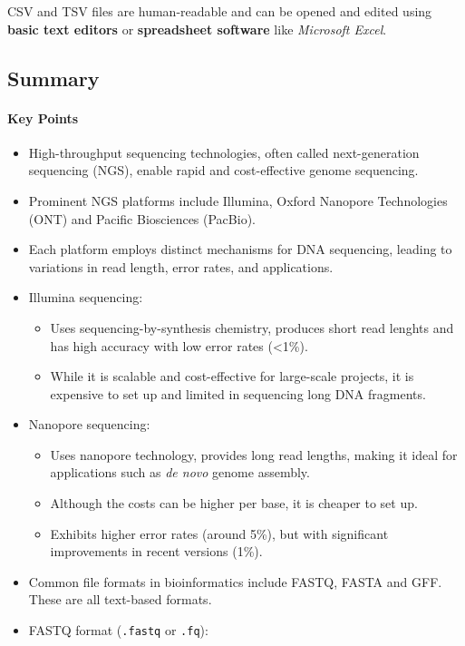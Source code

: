 \documentclass[
]{article}
\providecommand{\tightlist}{%
  \setlength{\itemsep}{0pt}\setlength{\parskip}{0pt}}
\begin{document}
CSV and TSV files are human-readable and can be opened and edited using
\textbf{basic text editors} or \textbf{spreadsheet software} like
\emph{Microsoft Excel}.

\subsection{Summary}\label{summary}

\paragraph{Key Points}\label{key-points}

\begin{itemize}
\tightlist
\item
  High-throughput sequencing technologies, often called next-generation
  sequencing (NGS), enable rapid and cost-effective genome sequencing.
\item
  Prominent NGS platforms include Illumina, Oxford Nanopore Technologies
  (ONT) and Pacific Biosciences (PacBio).
\item
  Each platform employs distinct mechanisms for DNA sequencing, leading
  to variations in read length, error rates, and applications.
\item
  Illumina sequencing:

  \begin{itemize}
  \tightlist
  \item
    Uses sequencing-by-synthesis chemistry, produces short read lenghts
    and has high accuracy with low error rates (\textless1\%).
  \item
    While it is scalable and cost-effective for large-scale projects, it
    is expensive to set up and limited in sequencing long DNA fragments.
  \end{itemize}
\item
  Nanopore sequencing:

  \begin{itemize}
  \tightlist
  \item
    Uses nanopore technology, provides long read lengths, making it
    ideal for applications such as \emph{de novo} genome assembly.
  \item
    Although the costs can be higher per base, it is cheaper to set up.
  \item
    Exhibits higher error rates (around 5\%), but with significant
    improvements in recent versions (1\%).
  \end{itemize}
\item
  Common file formats in bioinformatics include FASTQ, FASTA and GFF.
  These are all text-based formats.
\item
  FASTQ format (\texttt{.fastq} or \texttt{.fq}):


\end{itemize}
\end{document}
